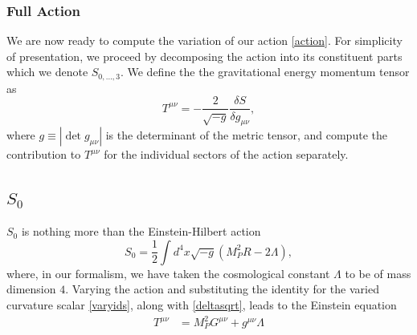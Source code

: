 \subsubsection*{Full Action}  
  We are now ready to compute the variation of our action \eqref{action}. For simplicity of presentation, we proceed by decomposing the action into its constituent parts which we denote $S_{0,...,3}$. We define the the gravitational energy momentum tensor as
 \begin{equation}
 T^{\mu\nu}=-\frac{2}{\sqrt{-g}}\frac{\delta S}{\delta g_{\mu\nu}},
 \end{equation}
 where $g\equiv |\det g_{\mu\nu}|$ is the determinant of the metric tensor, and compute the contribution to $T^{\mu\nu}$ for the individual sectors of the action separately.
\subsection{$S_0$}
$S_0$ is nothing more than the Einstein-Hilbert action
\begin{equation}
S_{0}=\frac{1}{2}\int d^{4}x\sqrt{-g}\left(M_P^2R-2\Lambda\right),
  \end{equation}
where, in our formalism, we have taken the cosmological constant $\Lambda$ to be of mass dimension $4$. Varying the action and substituting the identity for the varied curvature scalar \eqref{varyids},  along with \eqref{deltasqrt}, leads to the Einstein equation
\begin{equation}
\begin{aligned} T^{\mu\nu} & =M_P^2 G^{\mu\nu}+g^{\mu\nu}\Lambda\end{aligned}
 \end{equation}
